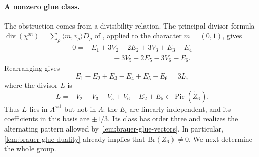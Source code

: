 \documentclass[11pt]{article}
\theoremstyle{plain}
\theoremstyle{definition}
\theoremstyle{remark}
\newcommand{\Pic}{\operatorname{Pic}}
\newcommand{\Br}{\mathrm{Br}}
\begin{document}
\paragraph{A nonzero glue class.}
The obstruction comes from a divisibility relation. The principal-divisor
formula
\(\operatorname{div}(\chi^m)=\sum_\rho\langle m,v_\rho\rangle D_\rho\)
of \cite[Theorem~4.1.3]{CoxLittleSchenck2011}, applied to the character
\(m=(0,1)\), gives
\[
\begin{aligned}
0={}&E_1+3V_2+2E_2+3V_3+E_3-E_4\\
&\hspace{3em}-3V_5-2E_5-3V_6-E_6.
\end{aligned}
\]
Rearranging gives
\begin{equation}\label{eq:brauer-six-glue}
E_1-E_2+E_3-E_4+E_5-E_6=3L,
\end{equation}
where the divisor \(L\) is
\[
L=-V_2-V_3+V_5+V_6-E_2+E_5
\in\Pic(\widetilde Z_6).
\]
Thus \(L\) lies in \(\Lambda^{\mathrm{sat}}\) but not in \(\Lambda\):
the \(E_i\) are linearly independent, and its coefficients in this basis
are \(\pm1/3\). Its class has order three and realizes the alternating
pattern allowed by \cref{lem:brauer-glue-vectors}.
In particular, \cref{lem:brauer-glue-duality} already implies that
\(\Br(Z_6)\ne0\). We next determine the whole group.
\end{document}
